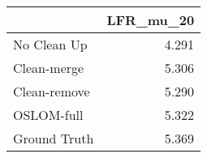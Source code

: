 \begin{tabular}{lr}
\toprule
{} & LFR_mu_20 \\
\midrule
No Clean Up  &     4.291 \\
Clean-merge  &     5.306 \\
Clean-remove &     5.290 \\
OSLOM-full   &     5.322 \\
Ground Truth &     5.369 \\
\bottomrule
\end{tabular}

